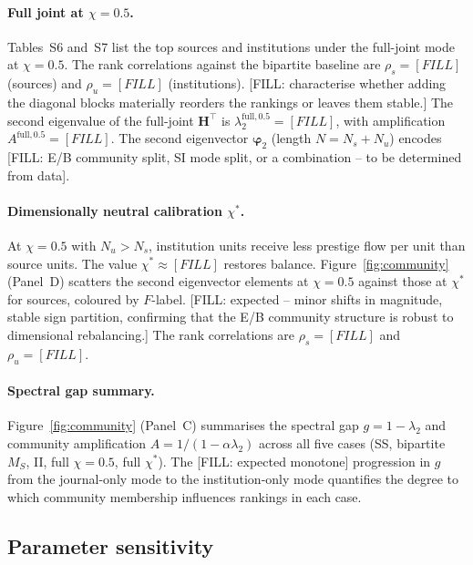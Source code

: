 \paragraph{Full joint at $\chi=0.5$.}
Tables~S6 and~S7 list the top sources and institutions under the full-joint
mode at $\chi=0.5$.
The rank correlations against the bipartite baseline are
$\rho_s=[FILL]$ (sources) and $\rho_u=[FILL]$ (institutions).
[FILL: characterise whether adding the diagonal blocks materially
reorders the rankings or leaves them stable.]
The second eigenvalue of the full-joint $\mathbf{H}^\top$ is
$\lambda_2^{\mathrm{full},0.5}=[FILL]$,
with amplification $A^{\mathrm{full},0.5}=[FILL]$.
The second eigenvector $\boldsymbol{\varphi}_2$ (length $N=N_s+N_u$)
encodes [FILL: E/B community split, S\/I mode split, or a combination
-- to be determined from data].

\paragraph{Dimensionally neutral calibration $\chi^*$.}
At $\chi=0.5$ with $N_u>N_s$, institution units receive less prestige
flow per unit than source units. The value $\chi^*\approx[FILL]$
restores balance.
Figure~\ref{fig:community} (Panel~D) scatters the second eigenvector
elements at $\chi=0.5$ against those at $\chi^*$ for sources,
coloured by $F$-label.
[FILL: expected -- minor shifts in magnitude, stable sign partition,
confirming that the E/B community structure is robust to dimensional
rebalancing.]
The rank correlations are $\rho_s=[FILL]$ and $\rho_u=[FILL]$.

\paragraph{Spectral gap summary.}
Figure~\ref{fig:community} (Panel~C) summarises the spectral gap
$g=1-\lambda_2$ and community amplification $A=1/(1-\alpha\lambda_2)$
across all five cases (SS, bipartite $M_S$, II, full $\chi=0.5$,
full $\chi^*$).
The [FILL: expected monotone] progression in $g$ from the journal-only
mode to the institution-only mode quantifies the degree to which
community membership influences rankings in each case.

\subsection{Parameter sensitivity}
\label{sec:results_sensitivity}

